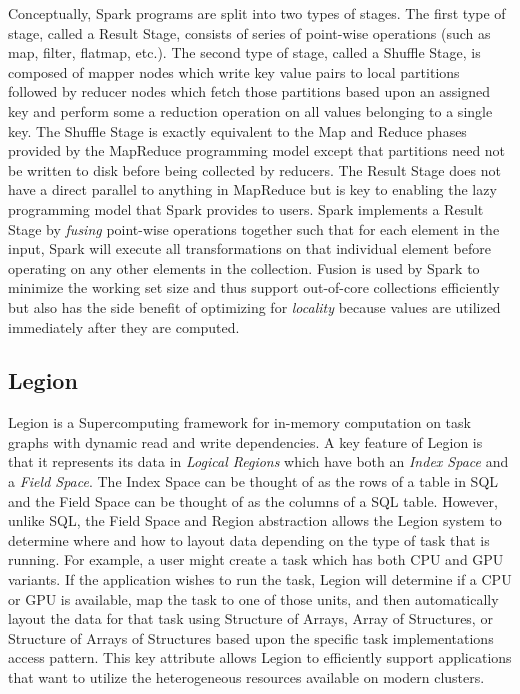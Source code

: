 \documentclass[tog]{acmsiggraph}
\begin{document}
Conceptually, Spark programs are split into two types of stages. The first type
of stage, called a Result Stage, consists of series of point-wise
operations (such as map, filter, flatmap, etc.). The second type of stage,
called a Shuffle Stage, is composed of mapper nodes which write key
value pairs to local partitions followed by reducer nodes which fetch those
partitions based upon an assigned key and perform some a reduction operation on
all values belonging to a single key. The Shuffle Stage is exactly equivalent
to the Map and Reduce phases provided by the MapReduce programming model except
that partitions need not be written to disk before being collected by
reducers. The Result Stage does not have a direct parallel to anything in
MapReduce but is key to enabling the lazy programming model that Spark provides
to users. Spark implements a Result Stage by \textit{fusing} point-wise
operations together such that for each element in the input, Spark will execute
all transformations on that individual element before operating on any other
elements in the collection. Fusion is used by Spark to minimize the working set
size and thus support out-of-core collections efficiently but also has the side
benefit of optimizing for \textit{locality} because values are utilized
immediately after they are computed.


\subsection{Legion}
Legion is a Supercomputing framework for in-memory computation on task graphs
with dynamic read and write dependencies. A key feature of Legion is that it
represents its data in \textit{Logical Regions} which have both an \textit{Index Space} and a
\textit{Field Space}. The Index Space can be thought of as the rows of a table in SQL
and the Field Space can be thought of as the columns of a SQL table. However,
unlike SQL, the Field Space and Region abstraction allows the Legion system to
determine where and how to layout data depending on the type of task that is
running. For example, a user might create a task which has both CPU and GPU
variants. If the application wishes to run the task, Legion will determine if a
CPU or GPU is available, map the task to one of those units, and then
automatically layout the data for that task using Structure of Arrays, Array of
Structures, or Structure of Arrays of Structures based upon the specific task
implementations access pattern. This key attribute allows Legion to efficiently
support applications that want to utilize the heterogeneous resources available
on modern clusters.
\end{document}
